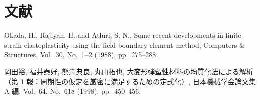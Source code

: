 \chapter{文献}
\begin{list}{}{\setlength{\leftmargin}{2em}\setlength{\itemindent}{-2em}\setlength{\topsep}{0pt}}
 \item Okada, H., Rajiyah, H. and Atluri, S. N.,
       Some recent developments in finite-strain elastoplasticity using the field-boundary element method,
       Computers \& Structures, Vol.~30, No.~1--2 (1988), pp.~275--288.
 \item 岡田裕, 福井泰好, 熊澤典良, 丸山拓也,
       大変形弾塑性材料の均質化法による解析（第 1 報：周期性の仮定を厳密に満足するための定式化）,
       日本機械学会論文集 A 編, Vol.~64, No.~618 (1998), pp.~450--456.
\end{list}
